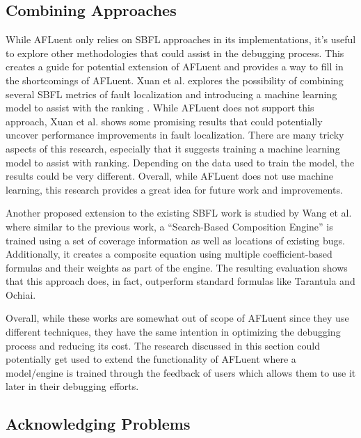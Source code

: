 \subsection{Combining Approaches}
\label{subsec:combining_approaches}

While AFLuent only relies on SBFL approaches in its implementations, it's
useful to explore other methodologies that could assist in the debugging
process. This creates a guide for potential extension of AFLuent and
provides a way to fill in the shortcomings of AFLuent. Xuan et al. explores the
possibility of combining several SBFL metrics of fault localization and
introducing a machine learning model to assist with the ranking
\cite{Xuan2014Combine}. While AFLuent does not support this approach, Xuan et
al. shows some promising results that could potentially uncover performance
improvements in fault localization. There are many tricky aspects of this
research, especially that it suggests training a machine learning model to
assist with ranking. Depending on the data used to train the model, the results
could be very different. Overall, while AFLuent does not use machine learning,
this research provides a great idea for future work and improvements.

Another proposed extension to the existing SBFL work is studied by Wang et al.
\cite{Wang2011Search} where similar to the previous work, a ``Search-Based
Composition Engine'' is trained using a set of coverage information as well as
locations of existing bugs. Additionally, it creates a composite equation using
multiple coefficient-based formulas and their weights as part of the engine. The
resulting evaluation shows that this approach does, in fact, outperform standard
formulas like Tarantula and Ochiai.

Overall, while these works are somewhat out of scope of AFLuent since they use
different techniques, they have the same intention in optimizing the debugging
process and reducing its cost. The research discussed in this section could
potentially get used to extend the functionality of AFLuent where a model/engine
is trained through the feedback of users which allows them to use it later in
their debugging efforts.

\subsection{Acknowledging Problems}
\label{subsec:acknowledging_problems}

